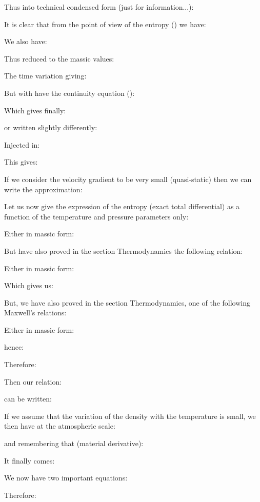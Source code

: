 	Thus into technical condensed form (just for information...):
	
	It is clear that from the point of view of the entropy () we have:
	
	We also have:
	
	Thus reduced to the massic values:
	
	The time variation giving:
	
	But with have the continuity equation ():
	
	Which gives finally:
	
	or written slightly differently:
	
	Injected in:
	
	This gives:
	
	If we consider the velocity gradient to be very small (quasi-static) then we can write the approximation:
	
	Let us now give the expression of the entropy (exact total differential) as a function of the temperature and pressure parameters only:
	
	Either in massic form:
	
	But have also proved in the section Thermodynamics the following relation:
	
	Either in massic form:
	
	Which gives us:
	
	But, we have also proved in the section Thermodynamics, one of the following Maxwell's relations:
	
	Either in massic form:
	
	hence:
	
	Therefore:
	
	Then our relation:
	
	can be written:
	
	If we assume that the variation of the density with the temperature is small, we then have at the atmospheric scale:
	
	and remembering that (material derivative):
	
	It finally comes:
	
	We now have two important equations:
	
	Therefore:
	
	
